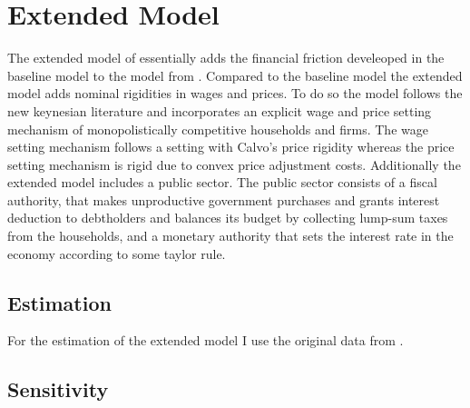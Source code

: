 \section{Extended Model}
\label{sec:extended_model}

The extended model of \textcite{jerman_macroeconomic_2012} essentially
adds the financial friction develeoped in the baseline model to the
model from \textcite{smets_shocks_2007}. Compared to the baseline model the
extended model adds nominal rigidities in wages and prices. To do so the model
follows the new keynesian literature and incorporates an explicit wage and
price setting mechanism of monopolistically competitive households and
firms. The wage setting mechanism follows a setting with Calvo's price
rigidity \parencite{calvo_staggered_1983} whereas the price setting mechanism
is rigid due to convex price adjustment costs. Additionally the extended model
includes a public sector. The public sector consists of a fiscal authority, that
makes unproductive government purchases and grants interest deduction to
debtholders and balances its budget by collecting lump-sum taxes from the
households, and a monetary authority that sets the interest rate in the economy
according to some taylor rule.

\subsection{Estimation}
\label{sec:estimation}

For the estimation of the extended model I use the original data from
\textcite{jerman_macroeconomic_2012}. 

\begin{table}
  \centering
  \caption{Parameterization}
  \label{tab:estimation}
\end{table}

\subsection{Sensitivity}
\label{sec:sensitivity}

\blindtext


